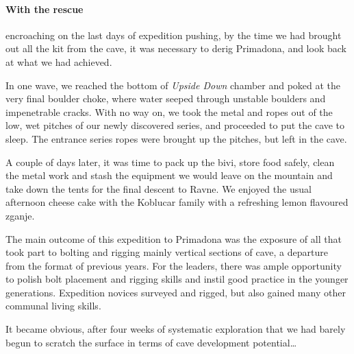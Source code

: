 \newpage
\begin{tcolorbox}
	
	\paragraph{With the rescue} encroaching on the last days of expedition pushing, by the time we had  brought out all the kit from the cave, it was necessary to derig Primadona, and look back at what we had achieved.

 	In one wave, we reached the bottom of \emph{Upside Down} chamber and poked at the very final boulder choke, where water seeped through unstable boulders and impenetrable cracks. With no way on, we took the metal and ropes out of the low, wet pitches of our newly discovered series, and proceeded to put the cave to sleep. The entrance series ropes were brought up the pitches, but left in the cave.

	A couple of days later, it was time to pack up the bivi, store food safely, clean the metal work and stash the equipment we would leave on the mountain and take down the tents for the final descent to Ravne. We enjoyed the usual afternoon cheese cake with the Koblucar family with a refreshing lemon flavoured zganje.

	The main outcome of this expedition to Primadona was the exposure of all that took part to bolting and rigging mainly vertical sections of cave, a departure from the format of previous years. For the leaders, there was ample opportunity to polish bolt placement and rigging skills and instil good practice in the younger generations. Expedition novices surveyed and rigged, but also gained many other communal living skills.

	It became obvious, after four weeks of systematic exploration that we had barely begun to scratch the surface in terms of cave development potential…
	\\
	\\
	\\
\end{tcolorbox}

  
\BgThispage

